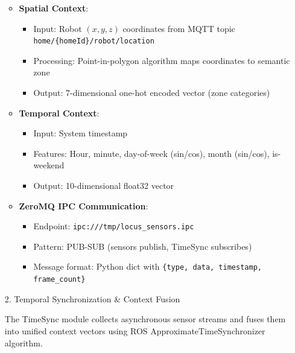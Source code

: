 \documentclass[conference]{IEEEtran}
\begin{document}
\begin{enumerate}
\begin{itemize}
\begin{itemize}
    \end{itemize}
    \item \textbf{Spatial Context}:
    \begin{itemize}
        \item Input: Robot $(x, y, z)$ coordinates from MQTT topic \texttt{home/\{homeId\}/robot/location}
        \item Processing: Point-in-polygon algorithm maps coordinates to semantic zone
        \item Output: 7-dimensional one-hot encoded vector (zone categories)
    \end{itemize}
    \item \textbf{Temporal Context}:
    \begin{itemize}
        \item Input: System timestamp
        \item Features: Hour, minute, day-of-week (sin/cos), month (sin/cos), is-weekend
        \item Output: 10-dimensional float32 vector
    \end{itemize}
    \item \textbf{ZeroMQ IPC Communication}:
    \begin{itemize}
        \item Endpoint: \texttt{ipc:///tmp/locus\_sensors.ipc}
        \item Pattern: PUB-SUB (sensors publish, TimeSync subscribes)
        \item Message format: Python dict with \texttt{\{type, data, timestamp, frame\_count\}}
    \end{itemize}
\end{itemize}

\item[2.] Temporal Synchronization \& Context Fusion

The TimeSync module collects asynchronous sensor streams and fuses them into unified context vectors using ROS ApproximateTimeSynchronizer algorithm.


\end{enumerate}
\end{document}
